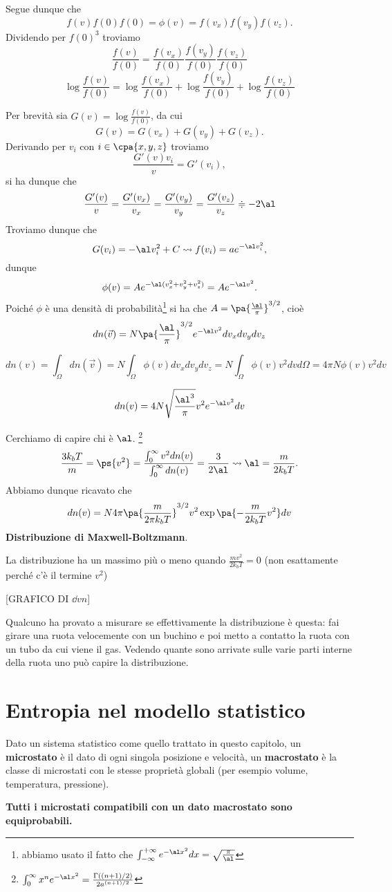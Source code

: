 Segue dunque che
\[f(v)f(0)f(0)=\phi(v)=f(v_x)f(v_y)f(v_z).\]
Dividendo per $f(0)^3$ troviamo
\[\frac{f(v)}{f(0)}=\frac{f(v_x)}{f(0)}\frac{f(v_y)}{f(0)}\frac{f(v_z)}{f(0)}\]
\[\log\frac{f(v)}{f(0)}=\log \frac{f(v_x)}{f(0)}+\log\frac{f(v_y)}{f(0)}+\log\frac{f(v_z)}{f(0)}\]


Per brevit\`a sia $G(v)=\log\frac{f(v)}{f(0)}$, da cui
\[G(v)=G(v_x)+G(v_y)+G(v_z).\]
Derivando per $v_i$ con $i\in\cpa{x,y,z}$ troviamo
\[\frac{G'(v)v_i}v=G'(v_i),\]
si ha dunque che
\[\frac{G'(v)}{v}=\frac{G'(v_x)}{v_x}=\frac{G'(v_y)}{v_y}=\frac{G'(v_z)}{v_z}\doteqdot -2\al\]
Troviamo dunque che
\[G(v_i)=-\al v_i^2+C\leadsto f(v_i)=ae^{-\al v_i^2},\]
dunque
\[\phi(v)=Ae^{-\al (v_x^2+v_y^2+v_z^2)}=Ae^{-\al v^2}.\]
Poich\'e $\phi$ \`e una densit\`a di probabilit\`a\footnote{abbiamo usato il fatto che $\int_{-\infty}^{+\infty}e^{-\al x^2}dx=\sqrt{\frac{\pi}\al}$} si ha che $A=\pa{\frac{\al}\pi}^{3/2}$, cio\`e
\[dn(\vec v)=N\pa{\frac{\al}\pi}^{3/2}e^{-\al v^2} dv_xdv_ydv_z\]

\[dn(v)=\int_\Omega dn(\vec v)=N\int_\Omega \phi(v)dv_xdv_ydv_z=N\int_\Omega \phi(v)v^2dvd\Omega=4\pi N\phi(v)v^2dv\]

\[dn(v)=4N\sqrt{\frac{\al^3}\pi}v^2e^{-\al v^2}dv\]

Cerchiamo di capire chi \`e $\al$. \footnote{$\int_0^\infty x^ne^{-\al x^2}=\frac{\Gamma((n+1)/2)}{2a^{(n+1)/2}}$}
\[\frac{3k_bT}m=\ps{v^2}=\frac{\int_0^\infty v^2dn(v)}{\int_0^\infty dn(v)}=\frac 3{2\al}\leadsto \al=\frac m{2k_b T}.\]
Abbiamo dunque ricavato che
\[dn(v)=N 4\pi\pa{\frac{m}{2\pi k_b T}}^{3/2}v^2\exp\pa{-\frac m{2k_bT}v^2}dv\]
\textbf{Distribuzione di Maxwell-Boltzmann}.

La distribuzione ha un massimo pi\`u o meno quando $\frac {mv^2}{2k_bT}=0$ (non esattamente perch\'e c'\`e il termine $v^2$)

[GRAFICO DI $\dd vn$]

Qualcuno ha provato a misurare se effettivamente la distribuzione \`e questa:
fai girare una ruota velocemente con un buchino e poi metto a contatto la ruota con un tubo da cui viene il gas. Vedendo quante sono arrivate sulle varie parti interne della ruota uno pu\`o capire la distribuzione.

\section{Entropia nel modello statistico}
\begin{definition}
Dato un sistema statistico come quello trattato in questo capitolo, un \textbf{microstato} \`e il dato di ogni singola posizione e velocit\`a, un \textbf{macrostato} \`e la classe di microstati con le stesse propriet\`a globali (per esempio volume, temperatura, pressione).
\end{definition}
\begin{fact}
\textbf{Tutti i microstati compatibili con un dato macrostato sono equiprobabili.}
\end{fact}

